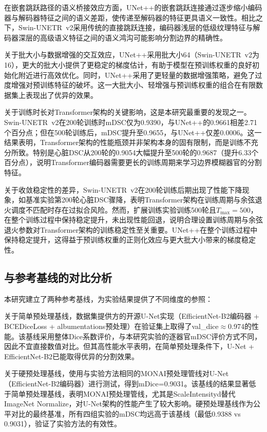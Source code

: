 \documentclass[12pt, a4paper]{article}
\begin{document}
在嵌套跳跃路径的语义桥接效应方面，UNet++的嵌套跳跃连接通过逐步缩小编码器与解码器特征之间的语义差距，使传递至解码器的特征更具语义一致性。相比之下，Swin-UNETR~v2采用传统的直接跳跃连接，编码器浅层的低级纹理特征与解码器深层的高级语义特征之间的语义鸿沟可能影响分割边界的精确性。

关于批大小与数据增强的交互效应，UNet++采用批大小64（Swin-UNETR~v2为16），更大的批大小提供了更稳定的梯度估计，有助于模型在预训练权重的良好初始化附近进行高效优化。同时，UNet++采用了更轻量的数据增强策略，避免了过度增强对预训练特征的破坏。这一大批大小、轻增强与预训练权重的组合在有限数据集上表现出了优异的效果。

关于训练时长对Transformer架构的关键影响，这是本研究最重要的发现之一。Swin-UNETR~v2在200轮训练时mDSC仅为0.9390，与UNet++的0.9661相差2.71个百分点；但在500轮训练后，mDSC提升至0.9655，与UNet++仅差0.0006。这一结果表明，Transformer架构的性能瓶颈并非架构本身的固有限制，而是训练不充分所致。特别是心脏DSC从200轮的0.9054大幅提升至500轮的0.9687（提升6.33个百分点），说明Transformer编码器需要更长的训练周期来学习边界模糊器官的分割特征。

关于收敛稳定性的差异，Swin-UNETR~v2在200轮训练后期出现了性能下降现象，如基准实验第200轮心脏DSC骤降，表明Transformer架构在训练周期与余弦退火调度不匹配时存在过拟合风险。然而，扩展训练实验训练500轮且$T_{\max}=500$，在整个训练过程中保持稳定提升，未出现性能回退，说明合理设置训练周期与余弦退火参数对Transformer架构的训练稳定性至关重要。UNet++在整个训练过程中保持稳定提升，这得益于预训练权重的正则化效应与更大批大小带来的梯度稳定性。

\subsection{与参考基线的对比分析}

本研究建立了两种参考基线，为实验结果提供了不同维度的参照：

关于简单预处理基线，数据集提供方的开源U-Net实现（EfficientNet-B2编码器 + BCEDiceLoss + albumentations预处理）在验证集上取得了val\_dice$\approx$0.974的性能。该基线采用整体Dice系数评价，与本研究实验的逐器官mDSC评价方式不同，因此不宜直接数值对比。但其高性能水平表明，在简单预处理条件下，U-Net + EfficientNet-B2已能取得优异的分割效果。

关于硬预处理基线，使用与实验方法相同的MONAI预处理管线对U-Net（EfficientNet-B2编码器）进行测试，得到mDice=0.9031。该基线的结果显著低于简单预处理基线，表明MONAI预处理管线，尤其是ScaleIntensityd替代ImageNet Normalize，对U-Net架构的性能产生了较大影响。硬预处理基线作为公平对比的最终基准，所有四组实验的mDSC均远高于该基线（最低0.9388 vs 0.9031），验证了实验方法的有效性。
\end{document}
